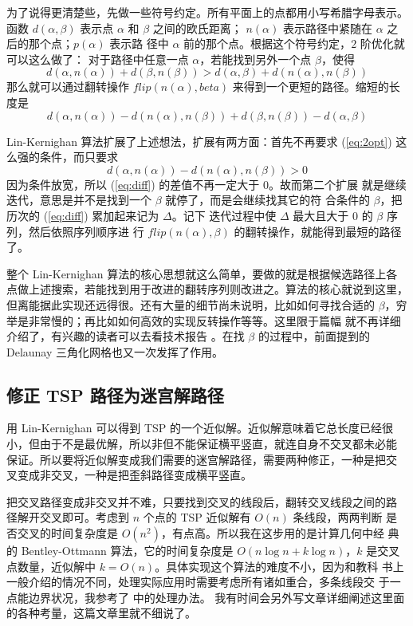 \documentclass[cs4size,a4paper,adobefonts]{ctexart}
\begin{document}
为了说得更清楚些，先做一些符号约定。所有平面上的点都用小写希腊字母表示。
函数 $d(\alpha,\beta)$ 表示点 $\alpha$ 和 $\beta$ 之间的欧氏距离；
$n(\alpha)$ 表示路径中紧随在 $\alpha$ 之后的那个点；$p(\alpha)$ 表示路
径中 $\alpha$ 前的那个点。根据这个符号约定，$2$ 阶优化就可以这么做了：
对于路径中任意一点 $\alpha$，若能找到另外一个点 $\beta$，使得
\begin{equation}\label{eq:2opt}
  d(\alpha,n(\alpha)) + d(\beta, n(\beta)) > d(\alpha, \beta) +
  d(n(\alpha), n(\beta))
\end{equation}
那么就可以通过翻转操作 $flip(n(\alpha), beta)$ 来得到一个更短的路径。缩短的长度是
\begin{equation}\label{eq:diff}
  d(\alpha,n(\alpha)) - d(n(\alpha), n(\beta)) + d(\beta, n(\beta)) -
  d(\alpha, \beta)
\end{equation}

Lin-Kernighan 算法扩展了上述想法，扩展有两方面：首先不再要求
(\ref{eq:2opt}) 这么强的条件，而只要求
\begin{equation}
  d(\alpha,n(\alpha)) - d(n(\alpha), n(\beta)) > 0
\end{equation}
因为条件放宽，所以 (\ref{eq:diff}) 的差值不再一定大于 0。故而第二个扩展
就是继续迭代，意思是并不是找到一个 $\beta$ 就停了，而是会继续找其它的符
合条件的 $\beta$，把历次的 (\ref{eq:diff}) 累加起来记为 $\Delta$。记下
迭代过程中使 $\Delta$ 最大且大于 0 的 $\beta$ 序列，然后依照序列顺序进
行 $flip(n(\alpha), \beta)$ 的翻转操作，就能得到最短的路径了。

整个 Lin-Kernighan 算法的核心思想就这么简单，要做的就是根据候选路径上各
点做上述搜索，若能找到用于改进的翻转序列则改进之。算法的核心就说到这里，
但离能据此实现还远得很。还有大量的细节尚未说明，比如如何寻找合适的
$\beta$，穷举是非常慢的；再比如如何高效的实现反转操作等等。这里限于篇幅
就不再详细介绍了，有兴趣的读者可以去看技术报告 \cite{1999finding}。在找
$\beta$ 的过程中，前面提到的 Delaunay 三角化网格也又一次发挥了作用。

\subsection{修正 TSP 路径为迷宫解路径}
用 Lin-Kernighan 可以得到 TSP 的一个近似解。近似解意味着它总长度已经很
小，但由于不是最优解，所以非但不能保证横平竖直，就连自身不交叉都未必能
保证。所以要将近似解变成我们需要的迷宫解路径，需要两种修正，一种是把交
叉变成非交叉，一种是把歪斜路径变成横平竖直。

把交叉路径变成非交叉并不难，只要找到交叉的线段后，翻转交叉线段之间的路
径解开交叉即可。考虑到 $n$ 个点的 TSP 近似解有 $O(n)$ 条线段，两两判断
是否交叉的时间复杂度是 $O(n^2)$，有点高。所以我在这步用的是计算几何中经
典的 Bentley-Ottmann 算法，它的时间复杂度是 $O(n\log n+k\log n)$，$k$
是交叉点数量，近似解中 $k=O(n)$。具体实现这个算法的难度不小，因为和教科
书上一般介绍的情况不同，处理实际应用时需要考虑所有诸如重合，多条线段交
于一点能边界状况，我参考了 \cite{Berg:2008:CGA:1370949} 中的处理办法。
我有时间会另外写文章详细阐述这里面的各种考量，这篇文章里就不细说了。
\end{document}
